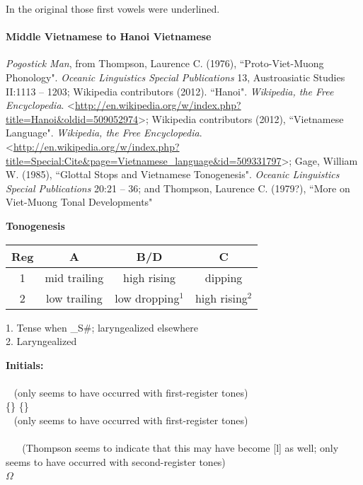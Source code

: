 \documentclass[11pt]{article}
\newcommand{\ipa}{\textipa}
\newcommand{\change}{\textrightarrow}
\begin{document}
In the original those first vowels were underlined.

\paragraph{Middle Vietnamese to Hanoi Vietnamese}{\it Pogostick Man}, from Thompson, Laurence C. (1976), ``Proto-Viet-Muong Phonology". {\it Oceanic Linguistics Special Publications} 13, Austroasiatic Studies II:1113 -- 1203; Wikipedia contributors (2012). ``Hanoi". {\it Wikipedia, the Free Encyclopedia}. \textless\url{http://en.wikipedia.org/w/index.php?title=Hanoi&oldid=509052974}\textgreater; Wikipedia contributors (2012), ``Vietnamese Language". {\it Wikipedia, the Free Encyclopedia}. \textless\url{http://en.wikipedia.org/w/index.php?title=Special:Cite&page=Vietnamese_language&id=509331797}\textgreater; Gage, William W. (1985), ``Glottal Stops and Vietnamese Tonogenesis". {\it Oceanic Linguistics Special Publications} 20:21 -- 36; and Thompson, Laurence C. (1979?), ``More on Viet-Muong Tonal Developments"

\textbf{Tonogenesis}
\begin{center}\begin{tabular}{| c | c | c | c |}\hline
Reg & A & B/D & C\\ \hline
1 & mid trailing & high rising & dipping\\
2 & low trailing & low dropping$^1$ & high rising$^2$\\\hline\end{tabular}\end{center}
1. Tense when _S\#; laryngealized elsewhere\\
2. Laryngealized

\textbf{Initials:}\\
\ipa{p\super h} \change\ \ipa{f}\\
\ipa{k\super h} \change\ \ipa{x} (only seems to have occurred with first-register tones)\\
\{\ipa{B,w}\} \{\ipa{d\super j,\textbardotlessj}\} \change\ \ipa{v z}\\
\ipa{\*r} \change\ \ipa{z} (only seems to have occurred with first-register tones)\\
\ipa{bl} \change\ \ipa{z}\\
\ipa{ml} \change\ \ipa{m\textltailn} \change\ \ipa{\textltailn} (Thompson seems to indicate that this may have become [l] as well; only seems to have occurred with second-register tones)\\
$\Omega$ \ipa{c\super h} \change\ \ipa{s tC}
\end{document}
